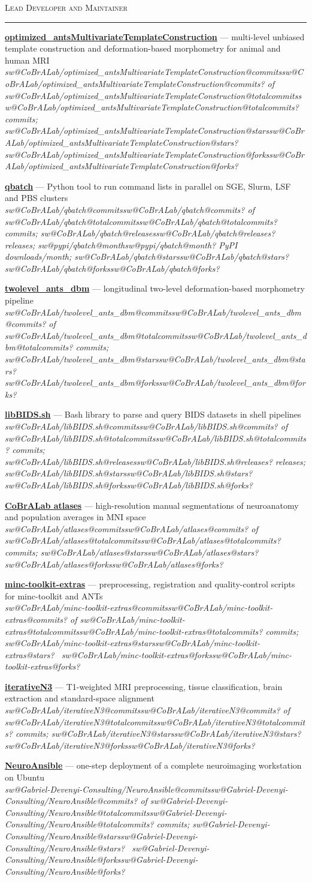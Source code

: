 \documentclass[margin1,line,canadian]{resume}
\makeatletter
\newif\ifshortcv
\newcommand{\swstat}[2]{\ifcsname sw@#1@#2\endcsname\csname sw@#1@#2\endcsname\else ?\fi}
\newcommand{\swgh}[1]{\swstat{#1}{stars}~\faStar{} \swstat{#1}{forks}~\faCodeBranch}
\newcommand{\swgroup}[1]{\par\Needspace{5\baselineskip}\vspace{2mm}%
 \noindent\parbox{\linewidth}{{\large\scshape #1}\\[-0.9ex]\rule{\linewidth}{0.6pt}}\par\nopagebreak}
\newcommand{\swrepo}[4]{\ifshortcv
 \textbf{\href{https://github.com/#1}{\color{black}#2}} --- #3 (\swgh{#1})\par
 \else
 \textbf{\href{https://github.com/#1}{\color{black}#2}} --- #3\\
 \textsl{#4}\par\fi}
\makeatother
\begin{document}
\begin{resume}
\swgroup{Lead Developer and Maintainer}
\swrepo{CoBrALab/optimized_antsMultivariateTemplateConstruction}{optimized\_antsMultivariateTemplateConstruction}%
 {multi-level unbiased template construction and deformation-based morphometry for animal and human MRI}%
 {\swstat{CoBrALab/optimized_antsMultivariateTemplateConstruction}{commits} of \swstat{CoBrALab/optimized_antsMultivariateTemplateConstruction}{totalcommits} commits; \swgh{CoBrALab/optimized_antsMultivariateTemplateConstruction}}
\swrepo{CoBrALab/qbatch}{qbatch}%
 {Python tool to run command lists in parallel on SGE, Slurm, LSF and PBS clusters}%
 {\swstat{CoBrALab/qbatch}{commits} of \swstat{CoBrALab/qbatch}{totalcommits} commits; \swstat{CoBrALab/qbatch}{releases} releases;
  \swstat{pypi/qbatch}{month} PyPI downloads/month; \swgh{CoBrALab/qbatch}}
\swrepo{CoBrALab/twolevel_ants_dbm}{twolevel\_ants\_dbm}%
 {longitudinal two-level deformation-based morphometry pipeline}%
 {\swstat{CoBrALab/twolevel_ants_dbm}{commits} of \swstat{CoBrALab/twolevel_ants_dbm}{totalcommits} commits; \swgh{CoBrALab/twolevel_ants_dbm}}
\swrepo{CoBrALab/libBIDS.sh}{libBIDS.sh}%
 {Bash library to parse and query BIDS datasets in shell pipelines}%
 {\swstat{CoBrALab/libBIDS.sh}{commits} of \swstat{CoBrALab/libBIDS.sh}{totalcommits} commits; \swstat{CoBrALab/libBIDS.sh}{releases} releases; \swgh{CoBrALab/libBIDS.sh}}
\swrepo{CoBrALab/atlases}{CoBrALab atlases}%
 {high-resolution manual segmentations of neuroanatomy and population averages in MNI space}%
 {\swstat{CoBrALab/atlases}{commits} of \swstat{CoBrALab/atlases}{totalcommits} commits; \swgh{CoBrALab/atlases}}
\swrepo{CoBrALab/minc-toolkit-extras}{minc-toolkit-extras}%
 {preprocessing, registration and quality-control scripts for minc-toolkit and ANTs}%
 {\swstat{CoBrALab/minc-toolkit-extras}{commits} of \swstat{CoBrALab/minc-toolkit-extras}{totalcommits} commits; \swgh{CoBrALab/minc-toolkit-extras}}
\swrepo{CoBrALab/iterativeN3}{iterativeN3}%
 {T1-weighted MRI preprocessing, tissue classification, brain extraction and standard-space alignment}%
 {\swstat{CoBrALab/iterativeN3}{commits} of \swstat{CoBrALab/iterativeN3}{totalcommits} commits; \swgh{CoBrALab/iterativeN3}}
\swrepo{Gabriel-Devenyi-Consulting/NeuroAnsible}{NeuroAnsible}%
 {one-step deployment of a complete neuroimaging workstation on Ubuntu}%
 {\swstat{Gabriel-Devenyi-Consulting/NeuroAnsible}{commits} of \swstat{Gabriel-Devenyi-Consulting/NeuroAnsible}{totalcommits} commits; \swgh{Gabriel-Devenyi-Consulting/NeuroAnsible}}


\end{resume}
\end{document}
